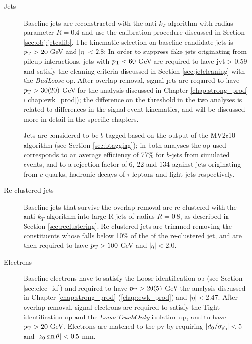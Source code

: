 \begin{description}

\item[Jets] Baseline jets are reconstructed with the anti-$k_T$ algorithm 
with radius parameter $R=0.4$ 
and use the calibration procedure discussed in Section \ref{sec:obj:jetcalib}. 
The kinematic selection on baseline candidate jets is  $p_{\rm T} > 20$ GeV and $|\eta|<2.8$; 
In order to suppress fake jets originating from pileup interactions, jets with $p_{\rm T}<60$ GeV are required to have \gls{jvt} > 0.59 and satisfy the cleaning criteria discussed in Section \ref{sec:jetcleaning} with the \textit{BadLoose} \gls{op}.
After overlap removal, signal jets are required to have $p_{\rm T}>30 (20)$ GeV for the analysis discussed in Chapter \ref{chap:strong_prod} (\ref{chap:ewk_prod}); the difference on the \pt threshold 
in the two analyses is related to differences in the signal event kinematics, and will be discussed more in detail in the specific chapters.

Jets are considered to be $b$-tagged based on the output of the MV2c10 algorithm (see Section \ref{sec:btagging}); in both analyses the \gls{op} used corresponds to an average efficiency of 77\% for $b$-jets from simulated  
\ttbar events, and to a rejection factor of 6, 22 and 134 against jets originating from $c$-quarks, hadronic decays of $\tau$ leptons and light jets respectively. 


\item[Re-clustered jets] Baseline jets that survive the overlap removal are re-clustered with the anti-$k_T$ algorithm into large-R jets of radius $R=0.8$, as described in Section \ref{sec:reclustering}. 
Re-clustered jets are trimmed removing the constituents whose \pt falls below 10\% of the \pt of the re-clustered jet, and are then required to have $p_{\rm T}>100$ GeV and $|\eta|<2.0$.

\item[Electrons] Baseline electrons have to satisfy the Loose identification \gls{op} (see Section \ref{sec:elec_id}) and required to have $p_{\rm T} > 20 (5)$ GeV the analysis discussed in Chapter \ref{chap:strong_prod} (\ref{chap:ewk_prod}) and $|\eta|<2.47$. 
After overlap removal, signal electrons are required to satisfy the Tight identification \gls{op} and the $LooseTrackOnly$ isolation \gls{op}, and  to have $p_{\rm T} > 20$ GeV.
Electrons are matched to the \gls{pv} by requiring $|{d_0}/\sigma_{d_0}| < 5$ and  $|{z_0} \sin\theta| < 0.5$ mm.



\end{description}
